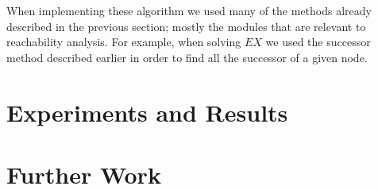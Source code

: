 \documentclass[11pt]{article}
\begin{document}
        When implementing these algorithm we used many of the methods already
        described in the previous section; mostly the modules that are relevant
        to reachability analysis. For example, when solving $EX$ we used the
        successor method described earlier in order to find all the successor
        of a given node.

\section{Experiments and Results}

\section{Further Work}

\pagebreak


\end{document}
